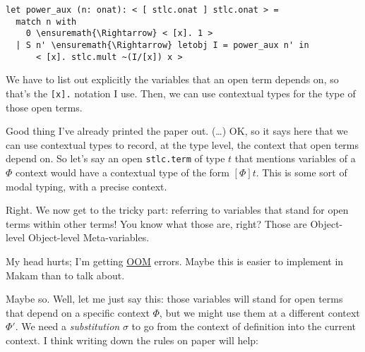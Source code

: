 \begin{verbatim}
let power_aux (n: onat): < [ stlc.onat ] stlc.onat > =
  match n with
    0 \ensuremath{\Rightarrow} < [x]. 1 >
  | S n' \ensuremath{\Rightarrow} letobj I = power_aux n' in
      < [x]. stlc.mult ~(I/[x]) x >
\end{verbatim}

\noindent
We have to list out explicitly the variables that an open term depends
on, so that's the \texttt{{[}x{]}.} notation I use. Then, we can use
contextual types \citep{nanevski2008contextual} for the type of those
open terms.

\heroSTUDENT{} Good thing I've already printed the paper out. (\ldots{}) OK,
so it says here that we can use contextual types to record, at the type
level, the context that open terms depend on. So let's say an open
\texttt{stlc.term} of type \(t\) that mentions variables of a \(\Phi\)
context would have a contextual type of the form \([\Phi] t\). This is
some sort of modal typing, with a precise context.

\heroADVISOR{} Right. We now get to the tricky part: referring to variables
that stand for open terms within other terms! You know what those are,
right? Those are Object-level Object-level Meta-variables.

\heroSTUDENT{} My head hurts; I'm getting
\href{https://en.wikipedia.org/wiki/Out_of_memory}{OOM} errors. Maybe
this is easier to implement in Makam than to talk about.

\heroADVISOR{} Maybe so. Well, let me just say this: those variables will
stand for open terms that depend on a specific context \(\Phi\), but we
might use them at a different context \(\Phi'\). We need a
\emph{substitution} \(\sigma\) to go from the context of definition into
the current context. I think writing down the rules on paper will help:

